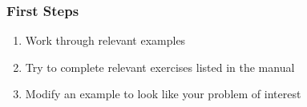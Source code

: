 \documentclass[aspectratio=169]{beamer}
\begin{document}
\begin{frame}[fragile]
  \frametitle{First Steps}
  \summary{}

  \begin{enumerate}
    \begin{bashcode}
      cd PATH_TO_PYLITH_DIR
      mkdir playpen
      cp -r src/pylith-5.0.1/examples playpen/
    \end{bashcode}
  \item Work through relevant examples
  \item Try to complete relevant exercises listed in the manual
  \item Modify an example to look like your problem of interest
  \end{enumerate}

\end{frame}

 
\end{document}

